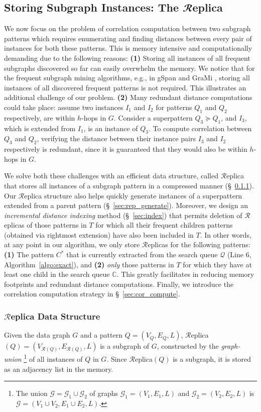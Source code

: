 \subsection{Storing Subgraph Instances: The $\mathbfcal{R}$eplica}
\label{sec:replica}
%
We now focus on the problem of correlation computation between two subgraph patterns
which requires enumerating and finding distances between every pair of instances for
both these patterns. This is memory intensive and computationally demanding due to the
following reasons: {\bf (1)} Storing all instances of all frequent subgraphs discovered so far
can easily overwhelm the memory. We notice that for the frequent
subgraph mining algorithms, e.g., in gSpan \cite{YH02} and GraMi \cite{EASK14},
storing all instances of all discovered frequent patterns is not required.
This illustrates an additional challenge of our problem. {\bf (2)} Many
redundant distance computations could take place: assume two instances
$I_1$ and $I_2$ for patterns $Q_1$ and $Q_2$ respectively, are within $h$-hops
in $G$. Consider a superpattern $Q_3 \succeq Q_1$, and $I_3$, which is extended from $I_1$, is an
instance of $Q_3$. To compute correlation between $Q_3$ and $Q_2$,
verifying the distance between their instance pairs $I_3$ and $I_2$ respectively
is redundant, since
it is guaranteed that they would also be within $h$-hops in $G$.

We solve both these challenges with an efficient data structure, called $\mathcal{R}$eplica
that stores all instances of a subgraph pattern in a compressed manner (\S~\ref{sec:rep_data}).
Our $\mathcal{R}$eplica structure also helps quickly generate instances of a superpattern
extended from a parent pattern (\S~\ref{sec:rep_generate}). Moreover, we design an {\em incremental distance
indexing} method (\S~\ref{sec:index}) that permits deletion of $\mathcal{R}$eplicas of those patterns in $T$
for which all their frequent children patterns (obtained via rightmost extension) have also
been included in $T$. In other words, at any point in our algorithm, we only store $\mathcal{R}$eplicas for the 
following patterns: {\bf (1)} The pattern $C^*$ that is currently extracted from the search queue $\mathcal{Q}$
(Line 6, Algorithm~\ref{algo:exact}), and {\bf (2)} {\em only} those patterns in $T$ for which they have at least one child
in the search queue $\mathbb{C}$. This greatly facilitates in reducing memory footprints 
and redundant distance computations. Finally, we introduce the
correlation computation strategy in \S~\ref{sec:cor_compute}.
%
\subsubsection{$\mathcal{R}$eplica Data Structure}
\label{sec:rep_data}
%
Given the data graph $G$ and a pattern $Q=(V_Q,E_Q,L)$, $\mathcal{R}$eplica$(Q)=(V_{\mathcal{R}(Q)},E_{\mathcal{R}(Q)},L)$ is a subgraph of $G$,
constructed by the {\em graph-union}
\footnote{{\footnotesize The union $\mathcal{G} = \mathcal{G}_1 \cup \mathcal{G}_2$ of graphs $\mathcal{G}_1=(V_1,E_1,L)$
and $\mathcal{G}_2=(V_2,E_2,L)$ is $\mathcal{G} = (V_1\cup V_2, E_1\cup E_2,L)$.}}
of all instances of $Q$ in $G$. Since $\mathcal{R}$eplica$(Q)$ is a subgraph, it is stored as an adjacency list in the memory.


